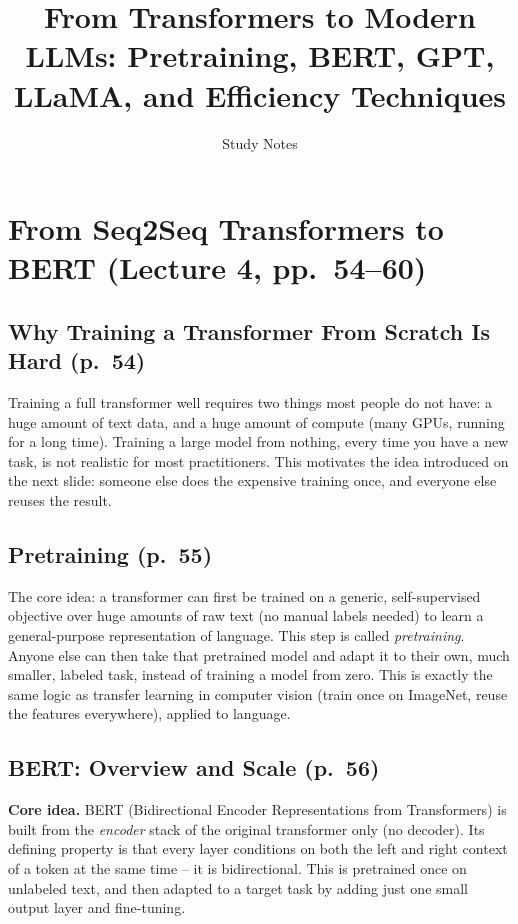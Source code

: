 \documentclass[11pt]{article}
\title{From Transformers to Modern LLMs: Pretraining, BERT, GPT, LLaMA, and Efficiency Techniques}
\author{Study Notes}
\date{}
\begin{document}
\maketitle

\section{From Seq2Seq Transformers to BERT (Lecture 4, pp.\ 54--60)}

\subsection{Why Training a Transformer From Scratch Is Hard (p.\ 54)}

Training a full transformer well requires two things most people do not have: a huge amount of text data, and a huge amount of compute (many GPUs, running for a long time). Training a large model from nothing, every time you have a new task, is not realistic for most practitioners. This motivates the idea introduced on the next slide: someone else does the expensive training once, and everyone else reuses the result.

\subsection{Pretraining (p.\ 55)}

The core idea: a transformer can first be trained on a generic, self-supervised objective over huge amounts of raw text (no manual labels needed) to learn a general-purpose representation of language. This step is called \emph{pretraining}. Anyone else can then take that pretrained model and adapt it to their own, much smaller, labeled task, instead of training a model from zero. This is exactly the same logic as transfer learning in computer vision (train once on ImageNet, reuse the features everywhere), applied to language.

\subsection{BERT: Overview and Scale (p.\ 56)}

\textbf{Core idea.} BERT (Bidirectional Encoder Representations from Transformers) is built from the \emph{encoder} stack of the original transformer only (no decoder). Its defining property is that every layer conditions on both the left and right context of a token at the same time -- it is bidirectional. This is pretrained once on unlabeled text, and then adapted to a target task by adding just one small output layer and fine-tuning.
\end{document}
